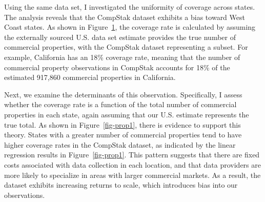 \documentclass[
  12pt]{article}
\begin{document}
Using the same data set, I investigated the uniformity of coverage
across states. The analysis reveals that the CompStak dataset exhibits a
bias toward West Coast states. As shown in Figure~\ref{fig-map}, the
coverage rate is calculated by assuming the externally sourced U.S. data
set estimate provides the true number of commercial properties, with the
CompStak dataset representing a subset. For example, California has an
18\% coverage rate, meaning that the number of commercial property
observations in CompStak accounts for 18\% of the estimated 917,860
commercial properties in California.

\begin{figure}


\caption{\label{fig-map}}

\end{figure}%

Next, we examine the determinants of this observation. Specifically, I
assess whether the coverage rate is a function of the total number of
commercial properties in each state, again assuming that our U.S.
estimate represents the true total. As shown in Figure~\ref{fig-prop1},
there is evidence to support this theory. States with a greater number
of commercial properties tend to have higher coverage rates in the
CompStak dataset, as indicated by the linear regression results in
Figure~\ref{fig-prop1}. This pattern suggests that there are fixed costs
associated with data collection in each location, and that data
providers are more likely to specialize in areas with larger commercial
markets. As a result, the dataset exhibits increasing returns to scale,
which introduces bias into our observations.
\end{document}
